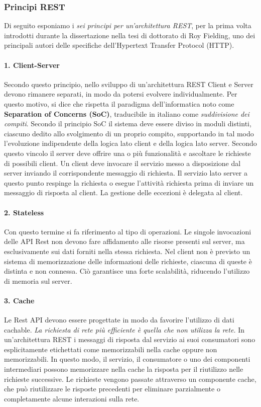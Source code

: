 \subsubsection{Principi REST}
Di seguito esponiamo i \textit{sei principi per un'architettura REST}, per la prima volta introdotti durante la dissertazione nella tesi di dottorato di Roy Fielding, uno dei principali autori delle specifiche dell'Hypertext Transfer Protocol (HTTP). \cite{fielding:restprinciples}

\paragraph{1. Client-Server} Secondo questo principio, nello sviluppo di un'architettura REST Client e Server devono rimanere separati, in modo da potersi evolvere individualmente. Per questo motivo, si dice che rispetta il paradigma dell'informatica noto come \textbf{Separation of Concerns (SoC)}, traducibile in italiano come \emph{suddivisione dei compiti}. Secondo il principio SoC il sistema deve essere diviso in moduli distinti, ciascuno dedito allo svolgimento di un proprio compito, supportando in tal modo l’evoluzione indipendente della logica lato client e della logica lato server. Secondo questo vincolo il server deve offrire una o più funzionalità e ascoltare le richieste di possibili client. Un client deve invocare il servizio messo a disposizione dal server inviando il corrispondente messaggio di richiesta. Il servizio lato server a questo punto respinge la richiesta o esegue l’attività richiesta prima di inviare un messaggio di risposta al client. La gestione delle eccezioni è delegata al client.

\paragraph{2. Stateless} Con questo termine si fa riferimento al tipo di operazioni. Le singole invocazioni delle API Rest non devono fare affidamento alle risorse presenti sul server, ma esclusivamente sui dati forniti nella stessa richiesta. Nel client non è previsto un sistema di memorizzazione delle informazioni delle richieste, ciascuna di queste è distinta e non connessa. Ciò garantisce una forte scalabilità, riducendo l'utilizzo di memoria sul server.

\paragraph{3. Cache} Le Rest API devono essere progettate in modo da favorire l'utilizzo di dati cachable. \emph{La richiesta di rete più efficiente è quella che non utilizza la rete.} In un'architettura REST i messaggi di risposta dal servizio ai suoi consumatori sono esplicitamente etichettati come memorizzabili nella cache oppure non memorizzabili. In questo modo, il servizio, il consumatore o uno dei componenti intermediari possono memorizzare nella cache la risposta per il riutilizzo nelle richieste successive. Le richieste vengono passate attraverso un componente cache, che può riutilizzare le risposte precedenti per eliminare parzialmente o completamente alcune interazioni sulla rete.

